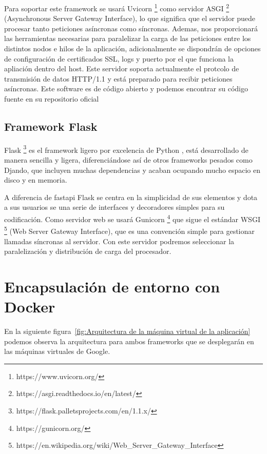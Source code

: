 Para soportar este framework se usará Uvicorn \footnote{https://www.uvicorn.org/} como servidor ASGI \footnote{https://asgi.readthedocs.io/en/latest/} (Asynchronous Server Gateway Interface), lo que significa que el servidor puede procesar tanto peticiones asíncronas como síncronas.
Ademas, nos proporcionará las herramientas necesarias para paralelizar la carga de las peticiones
entre los distintos nodos e hilos de la aplicación, adicionalmente se dispondrán de opciones de configuración de certificados SSL, logs y puerto por el que funciona la apliación dentro del host.
Este servidor soporta actualmente el protcolo de transmisión de datos HTTP/1.1 y está preparado para recibir peticiones asíncronas.
Este software es de código abierto y podemos encontrar su código fuente en su repositorio oficial

\subsection{Framework Flask}\label{subsec:framework-flask}
Flask \footnote{https://flask.palletsprojects.com/en/1.1.x/} es el framework ligero por excelencia de Python , está desarrollado de manera sencilla y ligera, diferenciándose así de otros frameworks pesados como Djando, que incluyen
muchas dependencias y acaban ocupando mucho espacio en disco y en memoria.

A diferencia de fastapi Flask se centra en la simplicidad de sus elementos y dota a sus usuarios se una serie de interfaces y decoradores simples para su codificación.
Como servidor web se usará Gunicorn \footnote{https://gunicorn.org/} que sigue el estándar WSGI \footnote{https://en.wikipedia.org/wiki/Web_Server_Gateway_Interface} (Web Server Gateway Interface), que es una convención simple para gestionar llamadas síncronas al servidor.
Con este servidor podremos seleccionar la paralelización y distribución de carga del procesador.


\section{Encapsulación de entorno con Docker}\label{sec:encapsulación-de-entorno-con-docker}
En la siguiente figura~\ref{fig:Arquitectura de la máquina virtual de la aplicación} podemos observa la arquitectura para ambos frameworks que se desplegarán en las máquinas virtuales de Google.

